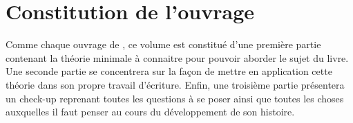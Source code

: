 %
%


\section{Constitution de l'ouvrage}

Comme chaque ouvrage de \laserie{}, ce volume est constitué d'une première partie contenant la théorie minimale à connaitre pour pouvoir aborder le sujet du livre. Une seconde partie se concentrera sur la façon de mettre en application cette théorie dans son propre travail d'écriture. Enfin, une troisième partie présentera un check-up reprenant toutes les questions à se poser ainsi que toutes les choses auxquelles il faut penser au cours du développement de son histoire.